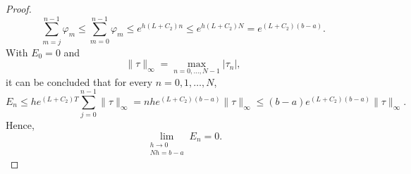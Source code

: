 \documentclass[10pt,a4paper]{amsart}
\begin{document}
\begin{proof}
\begin{equation*}
    \sum_{m=j}^{n-1} \varphi_m \leq \sum_{m=0}^{n-1} \varphi_m \leq e^{h(L + C_2) n} \leq e^{h(L + C_2) N} = e^{(L + C_2)(b - a)}.
\end{equation*}
With \( E_0 = 0 \) and
\[
\|\tau\|_\infty = \max_{n = 0, \dots, N-1} |\tau_n|,
\]
it can be concluded that for every \( n = 0, 1, \dots, N \),
\begin{equation*}
    E_n \leq h e^{(L + C_2) T} \sum_{j=0}^{n-1} \|\tau\|_\infty = n h e^{(L + C_2)(b - a)} \|\tau\|_\infty \leq (b - a) e^{(L + C_2)(b - a)} \|\tau\|_\infty.
\end{equation*}
Hence,
\begin{equation*}
\lim_{\substack{h \to 0 \\ N h = b - a}} E_n = 0.
\end{equation*}
\end{proof}
\end{document}
